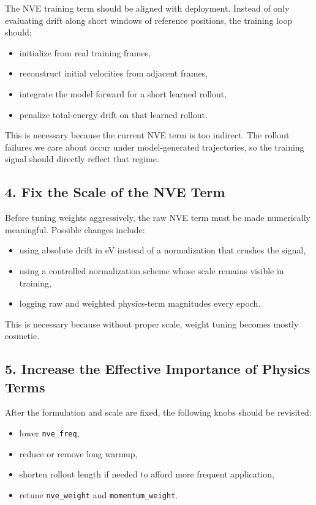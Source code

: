 \documentclass[11pt]{article}
\begin{document}
The NVE training term should be aligned with deployment. Instead of only evaluating drift along short windows of reference positions, the training loop should:

\begin{itemize}
  \item initialize from real training frames,
  \item reconstruct initial velocities from adjacent frames,
  \item integrate the model forward for a short learned rollout,
  \item penalize total-energy drift on that learned rollout.
\end{itemize}

This is necessary because the current NVE term is too indirect. The rollout failures we care about occur under model-generated trajectories, so the training signal should directly reflect that regime.

\subsection{4. Fix the Scale of the NVE Term}

Before tuning weights aggressively, the raw NVE term must be made numerically meaningful. Possible changes include:

\begin{itemize}
  \item using absolute drift in eV instead of a normalization that crushes the signal,
  \item using a controlled normalization scheme whose scale remains visible in training,
  \item logging raw and weighted physics-term magnitudes every epoch.
\end{itemize}

This is necessary because without proper scale, weight tuning becomes mostly cosmetic.

\subsection{5. Increase the Effective Importance of Physics Terms}

After the formulation and scale are fixed, the following knobs should be revisited:

\begin{itemize}
  \item lower \texttt{nve\_freq},
  \item reduce or remove long warmup,
  \item shorten rollout length if needed to afford more frequent application,
  \item retune \texttt{nve\_weight} and \texttt{momentum\_weight}.
\end{itemize}
\end{document}
